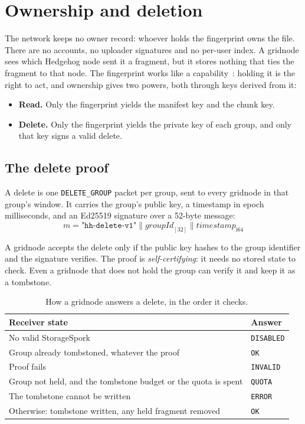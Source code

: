 \documentclass[10pt,a4paper,final]{article}
\newcommand{\code}[1]{\texttt{#1}}
\newcommand{\cat}{\mathbin{\|}}
\begin{document}
\section{Ownership and deletion}
\label{sec:ownership}

The network keeps no owner record: whoever holds the fingerprint owns the file. There are no accounts, no uploader
signatures and no per-user index. A gridnode sees which Hedgehog node sent it a fragment, but it stores nothing that
ties the fragment to that node. The fingerprint works like a capability~\cite{wilcox2008}: holding it is the right
to act, and ownership gives two powers, both through keys derived from it:

\begin{itemize}
	\item \textbf{Read.} Only the fingerprint yields the manifest key and the chunk key.
	\item \textbf{Delete.} Only the fingerprint yields the private key of each group, and only that key signs a
	      valid delete.
\end{itemize}

\subsection{The delete proof}

A delete is one \code{DELETE\_GROUP} packet per group, sent to every gridnode in that group's window. It carries the
group's public key, a timestamp in epoch milliseconds, and an Ed25519 signature over a 52-byte message:
\begin{equation}
	m = \texttt{"hh-delete-v1"} \cat \mathit{groupId}_{[32]} \cat \mathit{timestamp}_{\mathrm{i64}}
\end{equation}

A gridnode accepts the delete only if the public key hashes to the group identifier and the signature verifies. The
proof is \emph{self-certifying}: it needs no stored state to check. Even a gridnode that does not hold the group can
verify it and keep it as a tombstone.

\begin{table}[H]
\centering
\small
\begin{tabular}{@{}ll@{}}
\toprule
Receiver state & Answer \\
\midrule
No valid StorageSpork & \code{DISABLED} \\
Group already tombstoned, whatever the proof & \code{OK} \\
Proof fails & \code{INVALID} \\
Group not held, and the tombstone budget or the quota is spent & \code{QUOTA} \\
The tombstone cannot be written & \code{ERROR} \\
Otherwise: tombstone written, any held fragment removed & \code{OK} \\
\bottomrule
\end{tabular}
\caption{How a gridnode answers a delete, in the order it checks.}
\end{table}
\end{document}
